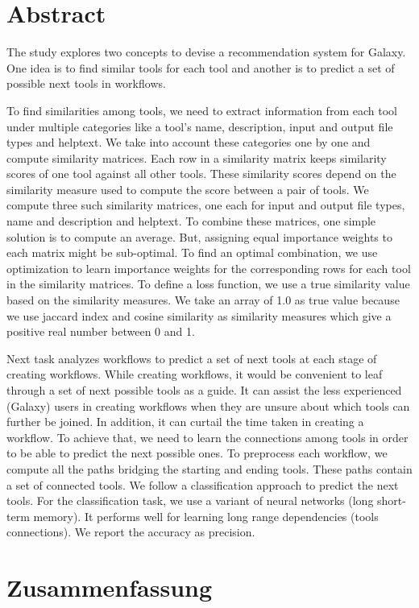 \chapter*{Abstract}
The study explores two concepts to devise a recommendation system for Galaxy. One idea is to find similar tools for each tool and another is to predict a set of possible next tools in workflows.

To find similarities among tools, we need to extract information from each tool under multiple categories like a tool's name, description, input and output file types and helptext. We take into account these categories one by one and compute similarity matrices. Each row in a similarity matrix keeps similarity scores of one tool against all other tools. These similarity scores depend on the similarity measure used to compute the score between a pair of tools. We compute three such similarity matrices, one each for input and output file types, name and description and helptext. To combine these matrices, one simple solution is to compute an average. But, assigning equal importance weights to each matrix might be sub-optimal. To find an optimal combination, we use optimization to learn importance weights for the corresponding rows for each tool in the similarity matrices. To define a loss function, we use a true similarity value based on the similarity measures. We take an array of 1.0 as true value because we use jaccard index and cosine similarity as similarity measures which give a positive real number between 0 and 1.

Next task analyzes workflows to predict a set of next tools at each stage of creating workflows. While creating workflows, it would be convenient to leaf through a set of next possible tools as a guide. It can assist the less experienced (Galaxy) users in creating workflows when they are unsure about which tools can further be joined. In addition, it can curtail the time taken in creating a workflow. To achieve that, we need to learn the connections among tools in order to be able to predict the next possible ones. To preprocess each workflow, we compute all the paths bridging the starting and ending tools. These paths contain a set of connected tools. We follow a classification approach to predict the next tools. For the classification task, we use a variant of neural networks (long short-term memory). It performs well for learning long range dependencies (tools connections). We report the accuracy as precision.


\chapter*{Zusammenfassung}
